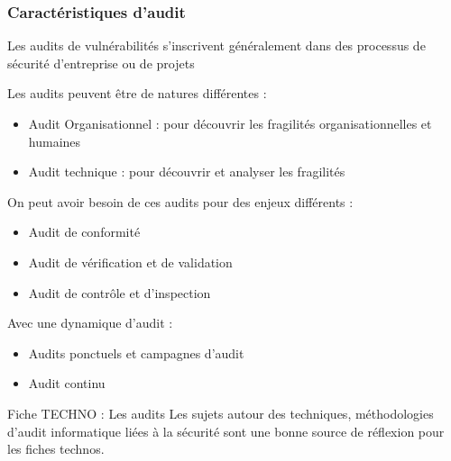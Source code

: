 \begin{frame}
\frametitle<presentation>{Caractéristiques d'audit}

Les audits de vulnérabilités s'inscrivent généralement dans des processus de sécurité d'entreprise ou de projets

Les audits peuvent être de natures différentes :

\begin{itemize}
  \item Audit Organisationnel : pour découvrir les fragilités organisationnelles et humaines
  \item Audit technique : pour découvrir et analyser les fragilités 
\end{itemize}

On peut avoir besoin de ces audits pour des enjeux différents :

\begin{itemize}
  \item Audit de conformité
  \item Audit de vérification et de validation
  \item Audit de contrôle et d'inspection
\end{itemize}

Avec une dynamique d'audit :  

\begin{itemize}
 	\item  Audits ponctuels et campagnes d'audit
	\item  Audit continu
\end{itemize}

\end{frame}

\begin{warningbox}{Fiche TECHNO : Les audits}
 Les sujets autour des techniques, méthodologies d'audit informatique liées à la sécurité sont une bonne source de réflexion pour les fiches technos.
\end{warningbox}





